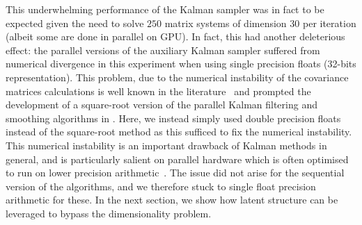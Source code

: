 This underwhelming performance of the Kalman sampler was in fact to be expected given the need to solve $250$ matrix systems of dimension $30$ per iteration (albeit some are done in parallel on GPU).
In fact, this had another deleterious effect: the parallel versions of the auxiliary Kalman sampler suffered from numerical divergence in this experiment when using single precision floats (32-bits representation). This problem, due to the numerical instability of the covariance matrices calculations is well known in the literature~\citep[see, e.g.][]{Bierman1977sqrt} and prompted the development of a square-root version of the parallel Kalman filtering and smoothing algorithms in \citet{Yaghoobi2022sqrt}. Here, we instead simply used double precision floats instead of the square-root method as this sufficed to fix the numerical instability. This numerical instability is an important drawback of Kalman methods in general, and is particularly salient on parallel hardware which is often optimised to run on lower precision arithmetic~\citep{jouppi2017datacenter}. The issue did not arise for the sequential version of the algorithms, and we therefore stuck to single float precision arithmetic for these. In the next section, we show how latent structure can be leveraged to bypass the dimensionality problem.